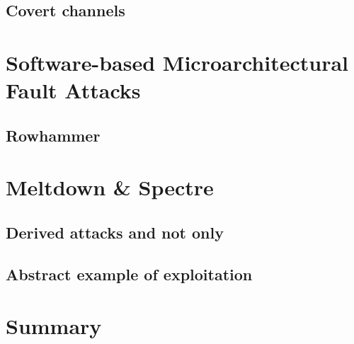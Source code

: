 \documentclass[final, xcolor = table, usenames, dvipsnames, table, aspectratio = 169]{beamer}
\begin{document}
\subsection{Covert channels}



\section{Software-based Microarchitectural Fault Attacks}


\subsection{Rowhammer}



\section{Meltdown \& Spectre}
% 


% 

% 

% 

\subsection{Derived attacks and not only}


\subsection{Abstract example of exploitation}



\section{Summary}



\end{document}
